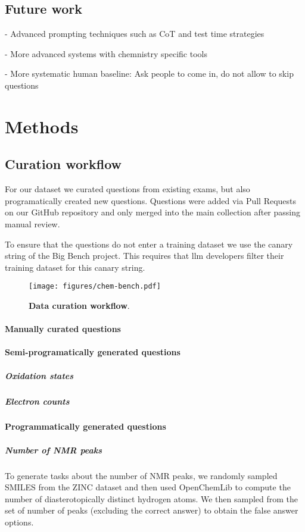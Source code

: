 \documentclass[11pt, oneside]{article}
\begin{document}
\subsection{Future work}
- Advanced prompting techniques such as CoT and test time strategies 

- More advanced systems with chemnistry specific tools 

- More systematic human baseline: Ask people to come in, do not allow to skip questions

\section{Methods}

\subsection{Curation workflow} \label{sec:curation}
For our dataset we curated questions from existing exams, but also programatically created new questions. 
Questions were added via Pull Requests on our GitHub repository and only merged into the main collection after passing manual review.

To ensure that the questions do not enter a training dataset we use the canary string of the Big Bench project.
This requires that \Gls{llm} developers filter their training dataset for this canary string.  

\begin{figure}
    \texttt{[image: figures/chem-bench.pdf]}
        \caption{\textbf{Data curation workflow}.}
\end{figure}

\paragraph{Manually curated questions}

\paragraph{Semi-programatically generated questions}

\subparagraph{Oxidation states}

\subparagraph{Electron counts}

\paragraph{Programmatically generated questions} 
\subparagraph{Number of NMR peaks} To generate tasks about the number of NMR peaks, we randomly sampled SMILES from the ZINC dataset and then used OpenChemLib\cite{openchemlib} to compute the number of diasterotopically distinct hydrogen atoms. 
We then sampled from the set of number of peaks (excluding the correct answer) to obtain the false answer options.
\end{document}
